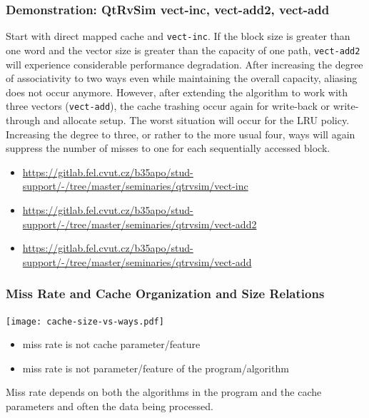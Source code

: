 \documentclass{beamer}
\begin{document}
\begin{frame}
\frametitle{Demonstration: QtRvSim vect-inc, vect-add2, vect-add}

Start with direct mapped cache and \texttt{vect-inc}. If the block size is greater than one word and the vector size is greater than the capacity of one path, \texttt{vect-add2} will experience considerable performance degradation. After increasing the degree of associativity to two ways even while maintaining the overall capacity, aliasing does not occur anymore. However, after extending the algorithm to work with three vectors (\texttt{vect-add}), the cache trashing occur again for write-back or write- through and allocate setup. The worst situation will occur for the LRU policy. Increasing the degree to three, or rather to the more usual four, ways will again suppress the number of misses to one for each sequentially accessed block.

\begin{itemize}
\item \url{https://gitlab.fel.cvut.cz/b35apo/stud-support/-/tree/master/seminaries/qtrvsim/vect-inc}
\item \url{https://gitlab.fel.cvut.cz/b35apo/stud-support/-/tree/master/seminaries/qtrvsim/vect-add2}
\item \url{https://gitlab.fel.cvut.cz/b35apo/stud-support/-/tree/master/seminaries/qtrvsim/vect-add}
\end{itemize}

\end{frame}

\begin{frame}
\frametitle{Miss Rate and Cache Organization and Size Relations}

{
\centering

\texttt{[image: cache-size-vs-ways.pdf]}

}

\begin{itemize}
\item miss rate is not cache parameter/feature
\item miss rate is not parameter/feature of the program/algorithm
\end{itemize}

Miss rate depends on both the algorithms in the program and the cache parameters
and often the data being processed.
\end{frame}
\end{document}
